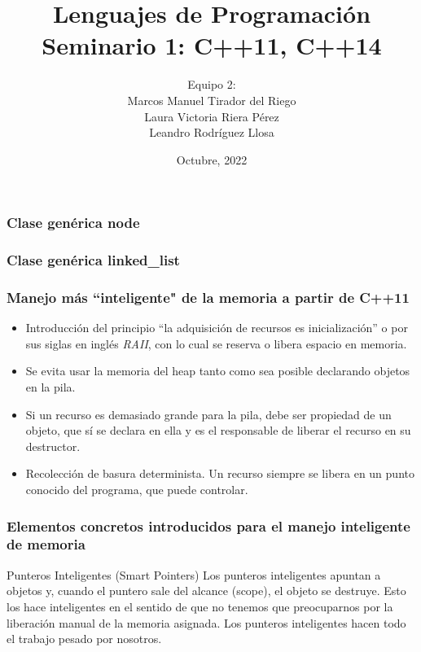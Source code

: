\documentclass{beamer}
\title{Lenguajes de Programaci\'on\\
\textbf{Seminario 1: C++11, C++14}}
\author{Equipo 2:\\
	Marcos Manuel Tirador del Riego\\ 
	Laura Victoria Riera P\'erez\\
	Leandro Rodr\'iguez Llosa}
\institute{Ciencias de la computaci\'on}
\date{Octubre, 2022}
\begin{document}
	\frame{\titlepage}
	
	\begin{frame}
		\frametitle{Clase genérica node}
		
	\end{frame}
	
	\begin{frame}
		\frametitle{Clase genérica linked\_list }
		
	\end{frame}
	
	\begin{frame}
		\frametitle{Manejo más ``inteligente" de la memoria a partir de C++11}
		
		\begin{itemize}
			\item Introducci\'on del principio ``la adquisición de recursos es inicialización'' o por sus siglas en ingl\'es \textit{RAII}, con lo cual se reserva o libera espacio en memoria. 
			
			\item Se evita usar la memoria del heap tanto como sea posible declarando objetos en la pila. 
			
			\item Si un recurso es demasiado grande para la pila, debe ser propiedad de un objeto, que s\'i se declara en ella y es el responsable de liberar el recurso en su destructor. 
			
			\item Recolecci\'on de basura determinista. Un recurso siempre se libera en un punto conocido del programa, que puede controlar.
		\end{itemize}
	\end{frame}
	
	\begin{frame}
		\frametitle{Elementos concretos introducidos para el manejo inteligente de memoria}
		
		\begin{block}{Punteros Inteligentes (Smart Pointers)}
	 		Los punteros inteligentes apuntan a objetos y, cuando el puntero sale del alcance (scope), el objeto se destruye. Esto los hace inteligentes en el sentido de que no tenemos que preocuparnos por la liberaci\'on manual de la memoria asignada. Los punteros inteligentes hacen todo el trabajo pesado por nosotros.
		\end{block}
	
	\end{frame}
	
\end{document}

